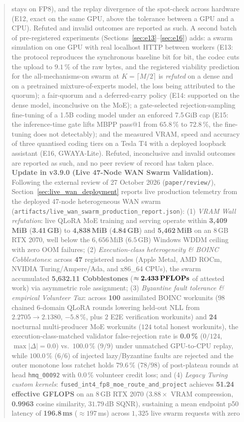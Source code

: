 \documentclass[11pt,a4paper]{article}
\begin{document}
\begin{abstract}
stays on FP8), and the replay divergence of the spot-check across hardware (E12, exact on the same GPU, above the tolerance between a GPU and a CPU). Refuted and invalid outcomes are reported as such. A second batch of pre-registered experiments (Sections~\ref{sec:e13}--\ref{sec:e16}) adds: a swarm simulation on one GPU with real localhost HTTP between workers (E13: the protocol reproduces the synchronous baseline bit for bit, the codec cuts the upload to $9.1\,\%$ of the raw bytes, and the registered viability prediction for the all-mechanisms-on swarm at $K=\lceil M/2\rceil$ is \emph{refuted} on a dense and on a pretrained mixture-of-experts model, the loss being attributed to the quorum); a fair-quorum and a deferred-carry policy (E14: supported on the dense model, inconclusive on the MoE); a gate-selected rejection-sampling fine-tuning of a 1.5B coding model under an enforced 7.5\,GiB cap (E15: the inference-time gate lifts MBPP pass@1 from $65.8\,\%$ to $72.8\,\%$, the fine-tuning does not detectably); and the measured VRAM, speed and accuracy of three quantised coding tiers on a Tesla T4 with a deployed loopback assistant (E16, GWAYA-Lite). Refuted, inconclusive and invalid outcomes are reported as such, and no peer review of record has taken place. \textbf{Update in v3.9.0 (Live 47-Node WAN Swarm Validation).} Following the external review of 27 October 2026 (\texttt{paper/review/}), Section~\ref{sec:live_wan_deployment} reports live production telemetry from the deployed 47-node heterogeneous WAN swarm (\texttt{artifacts/live\_wan\_swarm\_production\_report.json}): (1) \emph{VRAM Wall refutation}: live QLoRA MoE training and serving operate within \textbf{3{,}409\,MiB} (\textbf{3.41\,GB}) to \textbf{4{,}838\,MiB} (\textbf{4.84\,GB}) and \textbf{5{,}462\,MiB} on an 8\,GB RTX 2070, well below the $6{,}656$\,MiB ($6.5$\,GB) Windows WDDM ceiling with zero OOM failures; (2) \emph{Execution-class heterogeneity \& BOINC Cobblestones}: across \textbf{47} registered nodes (Apple Metal, AMD ROCm, NVIDIA Turing/Ampere/Ada, and x86\_64 CPUs), the swarm accumulated \textbf{5{,}632.11 Cobblestones} ($\approx \textbf{2.433\,PFLOPs}$ of attested work) via asymmetric role assignment; (3) \emph{Byzantine fault tolerance \& empirical Volunteer Tax}: across \textbf{100} assimilated BOINC workunits ($98$ chained 6-domain QLoRA rounds lowering held-out NLL from $2.2705 \to 2.1380$, $-5.8\,\%$, plus $2$ E2E verification workunits) and \textbf{24} nocturnal multi-producer MoE workunits ($124$ total honest workunits), the execution-class-matched validator false-rejection rate is \textbf{0.0\,\%} ($0/124$, $\max|\Delta| = 0.0$) vs.\ $100.0\,\%$ ($9/9$) under unmatched GPU-to-CPU replay, while $100.0\,\%$ ($6/6$) of injected lazy/Byzantine faults are rejected and the outer monotone loss ratchet holds $79.6\,\%$ ($78/98$) of post-plateau rounds at head \texttt{hmq\_00092} with $0.0\,\%$ volunteer credit loss; and (4) \emph{Legacy Turing custom kernels}: \texttt{fused\_int4\_fp8\_moe\_route\_and\_project} achieves \textbf{51.24 effective GFLOPS} on an 8\,GB RTX 2070 ($3.88\times$ VRAM compression, \textbf{0.9963} cosine similarity, $31.79$\,dB SQNR), sustaining a mean endpoint p50 latency of \textbf{196.8\,ms} ($\approx 197$\,ms) across $1{,}325$ live swarm requests with zero 
\end{abstract}
\end{document}
